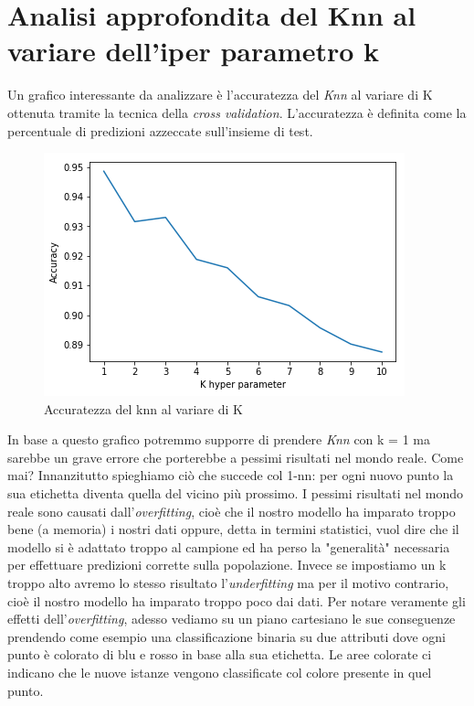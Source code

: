 \section{Analisi approfondita del Knn al variare dell'iper parametro k}
Un grafico interessante da analizzare \`e l'accuratezza del \textit{Knn} al variare di K ottenuta tramite la tecnica della \textit{cross validation}. L'accuratezza \`e definita come la percentuale di predizioni azzeccate sull'insieme di test.
\begin{figure}[H]
	\centering
	\includegraphics[width=0.7\linewidth]{img/accuracy_knn}
	\caption{Accuratezza del knn al variare di K}
	\label{fig:accuracyknn}
\end{figure}
In base a questo grafico potremmo supporre di prendere \textit{Knn} con k = 1 ma sarebbe un grave errore che porterebbe a pessimi risultati nel mondo reale. Come mai? Innanzitutto spieghiamo ci\`o che succede col 1-nn: per ogni nuovo punto la sua etichetta diventa quella del vicino pi\`u  prossimo. I pessimi risultati nel mondo reale sono causati dall'\textit{overfitting}, cio\`e che il nostro modello ha imparato troppo bene (a memoria) i nostri dati oppure, detta in termini statistici, vuol dire che il modello si \`e adattato troppo al campione ed ha perso la "generalit\`a" necessaria per effettuare predizioni corrette sulla popolazione. Invece se impostiamo un k troppo alto avremo lo stesso risultato l'\textit{underfitting} ma per il motivo contrario, cio\`e il nostro modello ha imparato troppo poco dai dati. Per notare veramente gli effetti dell'\textit{overfitting}, adesso vediamo su un piano cartesiano le sue conseguenze prendendo come esempio una classificazione binaria su due attributi dove ogni punto \`e colorato di blu e rosso in base alla sua etichetta. Le aree colorate ci indicano che le nuove istanze vengono classificate col colore presente in quel punto.


